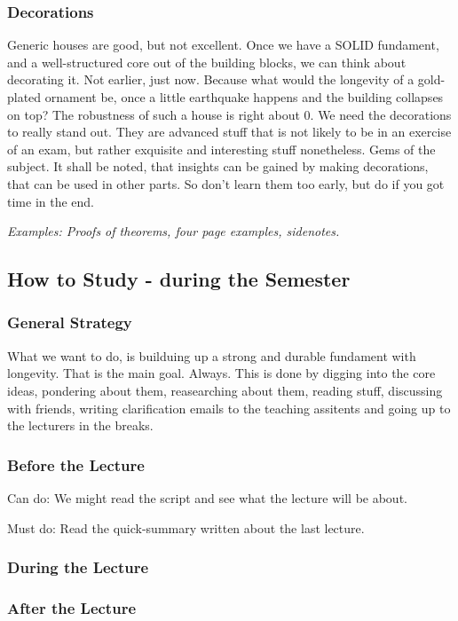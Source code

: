 \subsubsection{Decorations}
Generic houses are good, but not excellent. Once we have a SOLID fundament, and a well-structured core out of the building blocks, we can think about decorating it. Not earlier, just now. Because what would the longevity of a gold-plated ornament be, once a little earthquake happens and the building collapses on top? 
The robustness of such a house is right about 0. 
We need the decorations to really stand out. They are advanced stuff that is not likely to be in an exercise of an exam, but rather exquisite and interesting stuff nonetheless. Gems of the subject. It shall be noted, that insights can be gained by making decorations, that can be used in other parts. 
So don't learn them too early, but do if you got time in the end.

\textit{Examples: Proofs of theorems, four page examples, sidenotes.}


\subsection{How to Study - during the Semester}
\subsubsection{General Strategy}
What we want to do, is builduing up a strong and durable fundament with longevity. That is the main goal. Always. This is done by digging into the core ideas, pondering about them, reasearching about them, reading stuff, discussing with friends, writing clarification emails to the teaching assitents and going up to the lecturers in the breaks.

\subsubsection{Before the Lecture}
Can do: We might read the script and see what the lecture will be about. 

Must do: Read the quick-summary written about the last lecture. 

\subsubsection{During the Lecture}

\subsubsection{After the Lecture}

